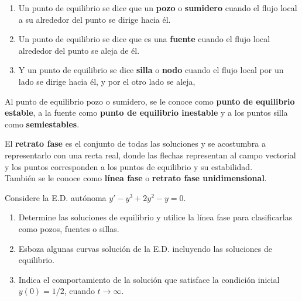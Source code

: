 \documentclass{beamer}
\begin{document}
\begin{frame}[t]
	\begin{definition}
		\begin{enumerate}
			\item Un punto de equilibrio se dice que un \textbf{pozo} o \textbf{sumidero} cuando el flujo local a su alrededor del punto se dirige hacia él.
			\item Un punto de equilibrio se dice que es una \textbf{fuente} cuando el flujo local alrededor del punto se aleja de él.
			\item Y un punto de equilibrio se dice \textbf{silla} o \textbf{nodo} cuando el flujo local por un lado se dirige hacia él, y por el otro lado se aleja,
		\end{enumerate}
	\end{definition}
	\begin{definition}
		Al punto de equilibrio pozo o sumidero, se le conoce como \textbf{punto de equilibrio estable}, a la fuente como \textbf{punto de equilibrio inestable} y a los puntos silla como \textbf{semiestables}.
	\end{definition}
\end{frame}

\begin{frame}[t]
	\vspace{-4mm}
	\begin{definition}
		El \textbf{retrato fase} es el conjunto de todas las soluciones y se acostumbra a representarlo con una recta real, donde las flechas representan al campo vectorial y los puntos corresponden a los puntos de equilibrio y su estabilidad. \\[2mm]
		También se le conoce como \textbf{línea fase} o \textbf{retrato fase unidimensional}.
	\end{definition}
	\vspace{-2mm}
	\begin{example}
		Considere la E.D. autónoma \(y' -y^3+2y^2-y=0\).
		\begin{enumerate}
			\item Determine las soluciones de equilibrio y utilice la línea fase para clasificarlas como pozos, fuentes o sillas.
			\item Esboza algunas curvas solución de la E.D. incluyendo las soluciones de equilibrio.
			\item Indica el comportamiento de la solución que satisface la condición inicial \(y(0) =1/2\), cuando \(t \longrightarrow \infty\).
		\end{enumerate}
	\end{example}
\end{frame}
\end{document}
